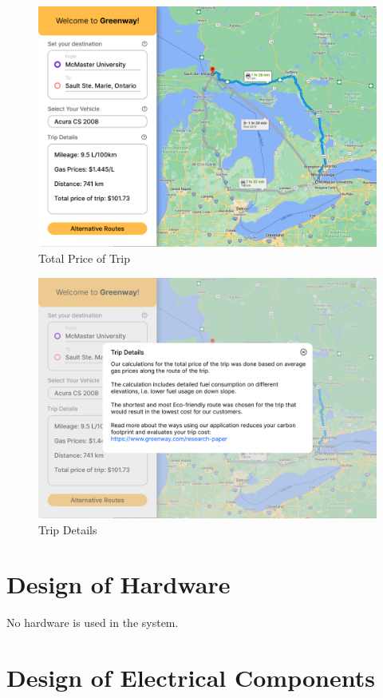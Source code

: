 \documentclass[12pt, titlepage]{article}
\begin{document}
\begin{figure}[h!]
    \centering
    \includegraphics[scale=0.26]{Desktop-7.png}
    \caption{Total Price of Trip}
\end{figure}
\begin{figure}[h!]
    \centering
    \includegraphics[scale=0.26]{Desktop-8.png}
    \caption{Trip Details}
\end{figure}

\newpage

\section{Design of Hardware}

No hardware is used in the system.

\section{Design of Electrical Components}
\end{document}
